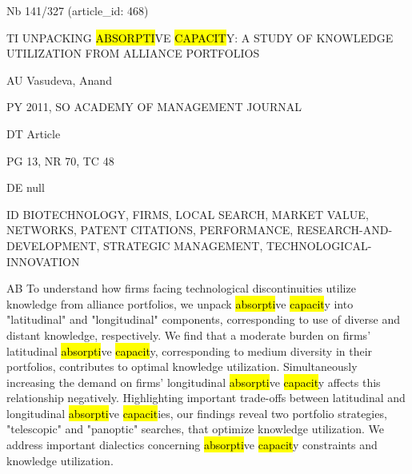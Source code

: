 \documentclass[a4paper]{article}
\begin{document}
\vspace*{-2cm}
Nb \tabto{0cm}141/327 (article\_id: 468)\par
TI \tabto{0cm}UNPACKING \hl{ABSORPTI}VE \hl{CAPACIT}Y: A STUDY OF KNOWLEDGE UTILIZATION FROM ALLIANCE PORTFOLIOS\par
AU \tabto{0cm}Vasudeva, Anand\par
PY \tabto{0cm}2011, SO ACADEMY OF MANAGEMENT JOURNAL\par
DT \tabto{0cm}Article\par
PG \tabto{0cm}13, NR 70, TC 48\par
DE \tabto{0cm}null\par
ID \tabto{0cm}BIOTECHNOLOGY, FIRMS, LOCAL SEARCH, MARKET VALUE, NETWORKS, PATENT CITATIONS, PERFORMANCE, RESEARCH-AND-DEVELOPMENT, STRATEGIC MANAGEMENT, TECHNOLOGICAL-INNOVATION\par
AB \tabto{0cm}To understand how firms facing technological discontinuities utilize knowledge from alliance portfolios, we unpack \hl{absorpti}ve \hl{capacit}y into "latitudinal" and "longitudinal" components, corresponding to use of diverse and distant knowledge, respectively. We find that a moderate burden on firms' latitudinal \hl{absorpti}ve \hl{capacit}y, corresponding to medium diversity in their portfolios, contributes to optimal knowledge utilization. Simultaneously increasing the demand on firms' longitudinal \hl{absorpti}ve \hl{capacit}y affects this relationship negatively. Highlighting important trade-offs between latitudinal and longitudinal \hl{absorpti}ve \hl{capacit}ies, our findings reveal two portfolio strategies, "telescopic" and "panoptic" searches, that optimize knowledge utilization. We address important dialectics concerning \hl{absorpti}ve \hl{capacit}y constraints and knowledge utilization.\par
\clearpage
\end{document}

